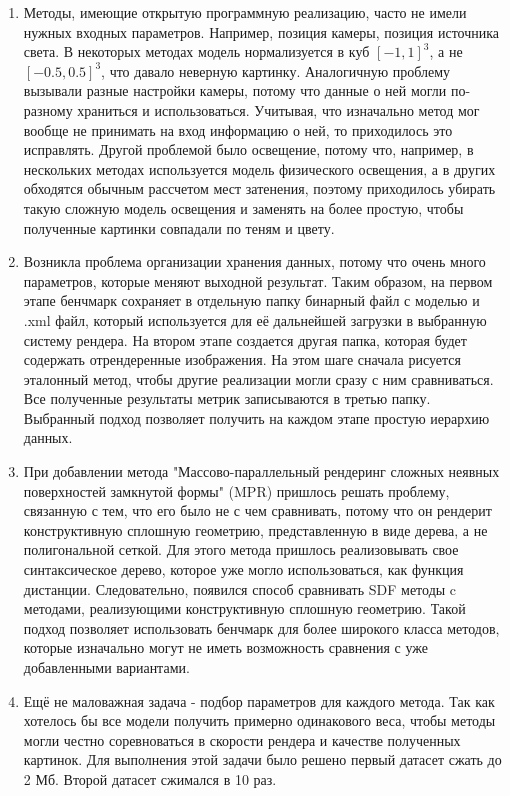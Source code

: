 \documentclass[a4paper,hidelinks,12pt]{article}
\begin{document}
\begin{enumerate}
	\item Методы, имеющие открытую программную реализацию, часто не имели нужных входных параметров. Например, позиция камеры, позиция источника света. В некоторых методах 
	модель нормализуется в куб $[-1, 1]^3$, а не $[-0.5, 0.5]^3$, что давало неверную картинку. Аналогичную проблему вызывали разные настройки камеры, потому что 
	данные о ней могли по-разному храниться и использоваться. Учитывая, что изначально метод мог вообще не принимать на вход информацию о ней, то приходилось 
	это исправлять. Другой проблемой было освещение, потому что, например, в нескольких методах используется модель физического освещения, а в других 
	обходятся обычным рассчетом мест затенения, поэтому приходилось убирать такую сложную модель освещения и заменять на более простую, чтобы полученные картинки 
	совпадали по теням и цвету. 
	\item Возникла проблема организации хранения данных, потому что очень много параметров, которые меняют выходной результат. Таким образом, на первом этапе 
	бенчмарк сохраняет в отдельную папку бинарный файл с моделью и .xml файл, который используется для её дальнейшей загрузки в выбранную систему рендера. На втором этапе создается 
	другая папка, которая будет содержать отрендеренные изображения. На этом шаге сначала рисуется эталонный метод, чтобы другие реализации могли сразу с ним 
	сравниваться. Все полученные результаты метрик записываются в третью папку. Выбранный подход позволяет получить на каждом этапе простую иерархию данных.
	\item При добавлении метода "Массово-параллельный рендеринг сложных неявных поверхностей замкнутой формы" (MPR) пришлось решать проблему, связанную с тем, 
	что его было не с чем сравнивать, потому что он рендерит конструктивную сплошную геометрию, представленную в виде дерева, а не полигональной сеткой. Для этого метода пришлось 
	реализовывать свое синтаксическое дерево, которое уже могло использоваться, как функция дистанции. Следовательно, появился способ сравнивать SDF методы c 
	методами, реализующими конструктивную сплошную геометрию. Такой подход позволяет использовать бенчмарк для более широкого класса методов, которые изначально 
	могут не иметь возможность сравнения с уже добавленными вариантами.
	\item Ещё не маловажная задача - подбор параметров для каждого метода. Так как хотелось бы все модели получить примерно одинакового веса, чтобы методы могли 
	честно соревноваться в скорости рендера и качестве полученных картинок. Для выполнения этой задачи было решено первый датасет сжать до 2 Мб. Второй датасет сжимался в 10 раз.
\end{enumerate}
\end{document}
